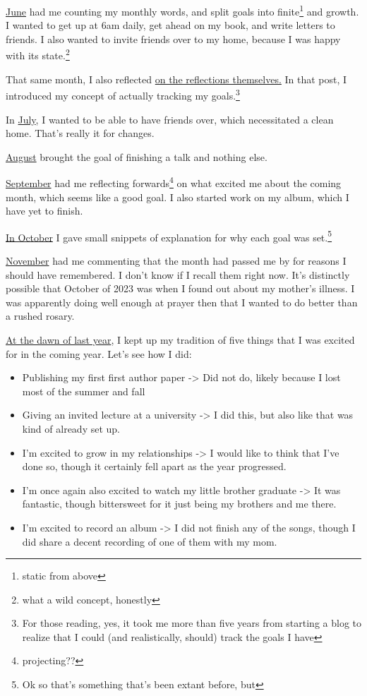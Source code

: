 \documentclass[12pt]{article}[titlepage]
\renewcommand{\,}{\textsuperscript{,}}
\begin{document}
\href{reflection-may-23}{June} had me counting my monthly words, and split goals into finite\footnote{static from above} and growth.  
I wanted to get up at 6am daily, get ahead on my book, and write letters to friends.  
I also wanted to invite friends over to my home, because I was happy with its state.\footnote{what a wild concept, honestly}

That same month, I also reflected \href{reflection-monthly-reflection}{on the reflections themselves.}  
In that post, I introduced my concept of actually tracking my goals.\footnote{For those reading, yes, it took me more than five years from starting a blog to realize that I could (and realistically, should) track the goals I have}

In \href{reflection-june-23}{July}, I wanted to be able to have friends over, which necessitated a clean home.  
That's really it for changes.

\href{reflection-july-23}{August} brought the goal of finishing a talk and nothing else.

\href{reflection-august-23}{September} had me reflecting forwards\footnote{projecting??} on what excited me about the coming month, which seems like a good goal.  
I also started work on my album, which I have yet to finish.

\href{reflection-september-23}{In October} I gave small snippets of explanation for why each goal was set.\footnote{Ok so that's something that's been extant before, but}

\href{reflection-october-23}{November} had me commenting that the month had passed me by for reasons I should have remembered. I don't know if I recall them right now. It's distinctly possible that October of 2023 was when I found out about my mother's illness.  
I was apparently doing well enough at prayer then that I wanted to do better than a rushed rosary.

\href{reflection-2023}{At the dawn of last year}, I kept up my tradition of five things that I was excited for in the coming year. Let's see how I did:

\begin{itemize}  
\item Publishing my first first author paper -> Did not do, likely because I lost most of the summer and fall  
\item Giving an invited lecture at a university -> I did this, but also like that was kind of already set up.  
\item I'm excited to grow in my relationships -> I would like to think that I've done so, though it certainly fell apart as the year progressed.  
\item I'm once again also excited to watch my little brother graduate -> It was fantastic, though bittersweet for it just being my brothers and me there.  
\item I'm excited to record an album -> I did not finish any of the songs, though I did share a decent recording of one of them with my mom.  
\end{itemize}
\end{document}

